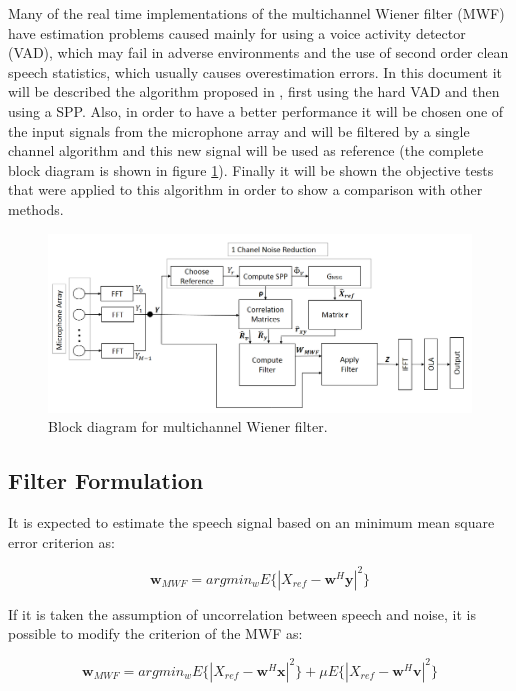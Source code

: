 Many of the real time implementations of the multichannel Wiener filter (MWF) have estimation problems caused mainly for using a voice activity detector (VAD), which may fail in adverse environments and the use of second order clean speech statistics, which usually causes overestimation errors. In this document it will be described the algorithm proposed in \cite{Yong2013}, first using the hard VAD and then using a SPP. Also, in order to have a better performance it will be chosen one of the input signals from the microphone array and will be filtered by a single channel algorithm and this new signal will be used as reference (the complete block diagram is shown in figure \ref{fig:diagMWF}). Finally it will be shown the objective tests that were applied to this algorithm in order to show a comparison with other  methods.

\begin{figure}[!ht]
  \centering
	\includegraphics[width=150mm]{Kap2/diagMWF}
	\caption{Block diagram for multichannel Wiener filter.}
	\label{fig:diagMWF}
\end{figure}

\subsection{Filter Formulation}

It is expected to estimate the speech signal based on an minimum mean square error criterion as:

\begin{equation}
\textbf{w}_{MWF}=arg min_w E\{|X_{ref}-\textbf{w}^H \textbf{y}|^2 \}
\label{criteria}
\end{equation}


If it is taken the assumption of uncorrelation between speech and noise, it is possible to modify the criterion of the MWF as:

$$\textbf{w}_{MWF}=arg min_w E\{|X_{ref}-\textbf{w}^H \textbf{x}|^2 \}+\mu E\{|X_{ref}-\textbf{w}^H \textbf{v}|^2 \}$$

